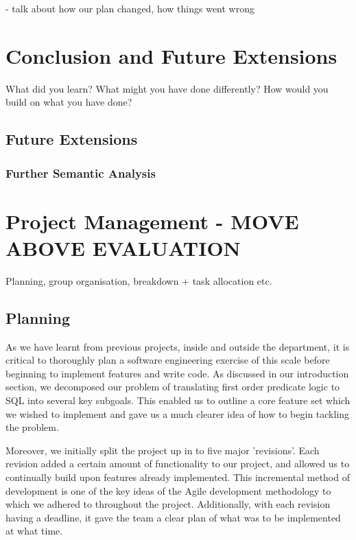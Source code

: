 \documentclass[a4paper, 11pt]{article}
\begin{document}
  - talk about how our plan changed, how things went wrong

\section{Conclusion and Future Extensions}
  What did you learn? What might you have done differently?
  How would you build on what you have done?

  \subsection{Future Extensions}

    \subsubsection{Further Semantic Analysis}

\section{Project Management - MOVE ABOVE EVALUATION}
  Planning, group organisation, breakdown + task allocation etc.

  \subsection{Planning}

    As we have learnt from previous projects, inside and outside the
    department, it is critical to thoroughly plan a software engineering
    exercise of this scale before beginning to implement features and write
    code. As discussed in our introduction section, we decomposed our problem
    of translating first order predicate logic to SQL into several key
    subgoals. This enabled us to outline a core feature set which we wished to
    implement and gave us a much clearer idea of how to begin tackling the
    problem.

    Moreover, we initially split the project up in to five major 'revisions'.
    Each revision added a certain amount of functionality to our project, and
    allowed us to continually build upon features already implemented. This
    incremental method of development is one of the key ideas of the Agile
    development methodology to which we adhered to throughout the project.
     Additionally, with each revision having a
    deadline, it gave the team a clear plan of what was to be implemented at
    what time.
\end{document}
